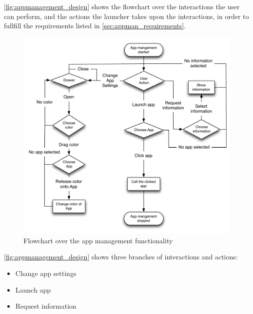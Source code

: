 
\label{sec:appman_solution}

\autoref{fig:appmanagement_design} shows the flowchart over the interactions the user can perform, and the actions the launcher takes upon the interactions, in order to fullfill the requirements listed in \autoref{sec:appman_requirements}.

\begin{figure}[h]
	\centering
	\includegraphics[width=1\textwidth]{gfx/appmanagement.pdf}
	\caption{Flowchart over the app management functionality}
	\label{fig:appmanagement_design}
\end{figure}

\autoref{fig:appmanagement_design} shows three branches of interactions and actions:

\begin{itemize}
	\item Change app settings
	\item Launch app
	\item Request information
\end{itemize}


